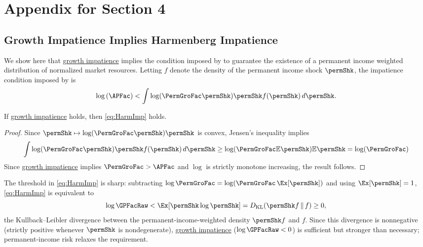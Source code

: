 \documentclass[\econtexRoot/BufferStockTheory]{subfiles}
\begin{document}
\hypertarget{ApndxBalancedGrowthcNrmAndCov}{}

\section{Appendix for Section 4}

\subsection{Growth Impatience Implies Harmenberg Impatience}\label{sec:AppxHarmImpGIC}


We show here that \hyperlink{GICRaw}{growth impatience} implies the condition imposed by \cite{harmenbergAggregating} to guarantee 
the existence of a permanent income weighted distribution of normalized market resources.
Letting $f$ denote the density of the permanent income shock $\permShk$, the impatience condition imposed by \cite{harmenbergAggregating} is
%
%
\begin{equation}
  \label{eq:HarmImp}
  \log \left( \APFac \right) < \int \log(\PermGroFac\permShk) \permShk f(\permShk)\,d\permShk .
\end{equation}
%
%

\begin{claim}\label{claim:gicimpliesharmimp}
  If \hyperlink{GICRaw}{growth impatience} holds, then \eqref{eq:HarmImp} holds.
\end{claim}
%
\begin{proof}
Since $\permShk\mapsto \log(\PermGroFac\permShk) \permShk$ is convex, Jensen's inequality implies
%
\begin{equation}
  \label{eq:Jensen}
  \int \log(\PermGroFac\permShk) \permShk f(\permShk)\,d\permShk \geq \log(\PermGroFac\mathbb{E}\permShk) \mathbb{E}\permShk = \log(\PermGroFac)
\end{equation}
%
Since \hyperlink{GICRaw}{growth impatience} implies $\PermGroFac > \APFac$ and $\log$ is strictly monotone increasing, the result follows.

\end{proof}

\begin{remark}
The threshold in \eqref{eq:HarmImp} is sharp: subtracting $\log\PermGroFac = \log(\PermGroFac\,\Ex[\permShk])$ and using $\Ex[\permShk]=1$, \eqref{eq:HarmImp} is equivalent to
\begin{equation*}
  \log \GPFacRaw < \Ex[\permShk\log\permShk] = D_{\mathrm{KL}}(\permShk f \,\Vert\, f) \geq 0 ,
\end{equation*}
the Kullback--Leibler divergence between the permanent-income-weighted density $\permShk f$ and $f$. Since this divergence is nonnegative (strictly positive whenever $\permShk$ is nondegenerate), \hyperlink{GICRaw}{growth impatience} ($\log\GPFacRaw<0$) is sufficient but stronger than necessary; permanent-income risk relaxes the requirement.
\end{remark}
\end{document}
